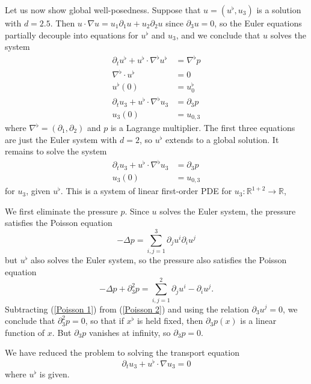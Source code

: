 \documentclass[10pt]{article}
\newcommand{\RR}{\mathbb{R}}
\theoremstyle{definition}
\begin{document}
Let us now show global well-posedness.
Suppose that $u = (u^\flat, u_3)$ is a solution with $d = 2.5$.
Then $u \cdot \nabla u = u_1 \partial_1 u + u_2 \partial_2 u$ since $\partial_3 u = 0$, so the Euler equations partially decouple into equations for $u^\flat$ and $u_3$, and we conclude that $u$ solves the system
\begin{align*}
\partial_t u^\flat + u^\flat \cdot \nabla^\flat u^\flat &= \nabla^\flat p\\
\nabla^\flat \cdot u^\flat &= 0\\
u^\flat(0) &= u_0^\flat\\
\partial_t u_3 + u^\flat \cdot \nabla^\flat u_3 &= \partial_3 p\\
u_3(0) &= u_{0,3}
\end{align*}
where $\nabla^\flat = (\partial_1, \partial_2)$ and $p$ is a Lagrange multiplier.
The first three equations are just the Euler system with $d = 2$, so $u^\flat$ extends to a global solution.
It remains to solve the system
\begin{align*}
\partial_t u_3 + u^\flat \cdot \nabla^\flat u_3 &= \partial_3 p\\
u_3(0) &= u_{0, 3}
\end{align*}
for $u_3$, given $u^\flat$. This is a system of linear first-order PDE for $u_3: \RR^{1+2} \to \RR$,

We first eliminate the pressure $p$.
Since $u$ solves the Euler system, the pressure satisfies the Poisson equation
\begin{equation}
\label{Poisson 1}
-\Delta p = \sum_{i,j=1}^3 \partial_j u^i \partial_i u^j
\end{equation}
but $u^\flat$ also solves the Euler system, so the pressure also satisfies the Poisson equation
\begin{equation}
\label{Poisson 2}
-\Delta p + \partial_3^2 p = \sum_{i,j=1}^2 \partial_j u^i - \partial_i u^j.
\end{equation}
Subtracting (\ref{Poisson 1}) from (\ref{Poisson 2}) and using the relation $\partial_3 u^j = 0$, we conclude that $\partial_3^2 p = 0$, so that if $x^\flat$ is held fixed, then $\partial_3 p(x)$ is a linear function of $x$.
But $\partial_3 p$ vanishes at infinity, so $\partial_3 p = 0$.

We have reduced the problem to solving the transport equation
\begin{equation}
\label{linear transport}
\partial_t u_3 + u^\flat \cdot \nabla u_3 = 0
\end{equation}
where $u^\flat$ is given.
\end{document}
